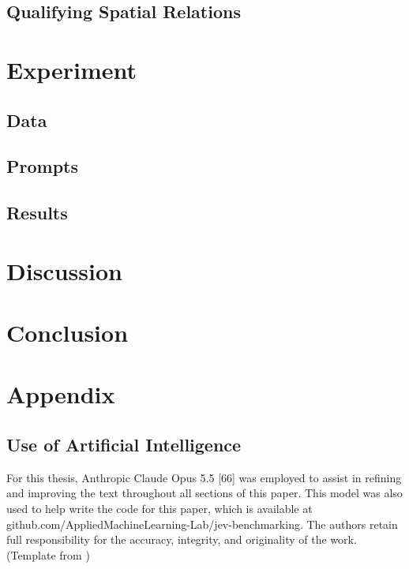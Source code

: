 \section{Qualifying Spatial Relations}


\chapter{Experiment}

\section{Data}

\section{Prompts}

\section{Results}


\chapter{Discussion}



\chapter{Conclusion}


\printbibliography[heading=bibintoc, title={Bibliography}]

\chapter*{Appendix}

\section*{Use of Artificial Intelligence}
For this thesis, Anthropic Claude Opus 5.5 [66] was employed to assist in refining and improving the text throughout all sections of this paper. This model was also used to help write the code for this paper, which is available at github.com/AppliedMachineLearning-Lab/jev-benchmarking. The authors retain full responsibility for the accuracy, integrity, and originality of the work. (Template from \cite{deusserEvaluatingBenchmarkingSystem2026})


